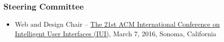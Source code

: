 \documentclass[10pt]{article}
\newenvironment{innerlist}[1][\enskip\textbullet]%
        {\begin{itemize}[#1,leftmargin=*,parsep=0pt,itemsep=0pt,topsep=0pt,partopsep=0pt]}
        {\end{itemize}}
\begin{document}
\subsubsection*{Steering Committee}
\begin{innerlist}
\item[--] Web and Design Chair -- \href{http://iui.acm.org/2016/committee.html}{The 21st ACM International Conference on Intelligent User Interfaces (IUI)}, March 7, 2016, Sonoma, California
\end{innerlist}

\end{document}
